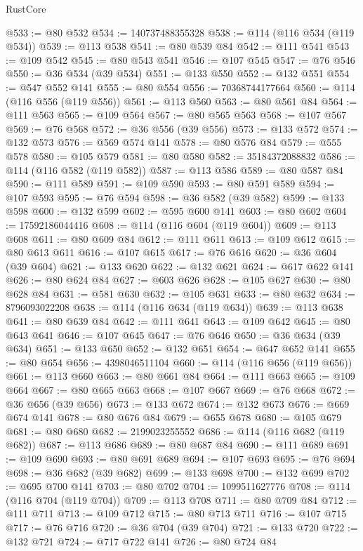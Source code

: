 \begin{lexlean}{RustCore}
\begin{coremodule}
@533 := @80 @532
@534 := 140737488355328
@538 := @114 (@116 @534 (@119 @534))
@539 := @113 @538
@541 := @80 @539 @84
@542 := @111 @541
@543 := @109 @542
@545 := @80 @543 @541
@546 := @107 @545
@547 := @76 @546
@550 := @36 @534 (@39 @534)
@551 := @133 @550
@552 := @132 @551
@554 := @547 @552 @141
@555 := @80 @554
@556 := 70368744177664
@560 := @114 (@116 @556 (@119 @556))
@561 := @113 @560
@563 := @80 @561 @84
@564 := @111 @563
@565 := @109 @564
@567 := @80 @565 @563
@568 := @107 @567
@569 := @76 @568
@572 := @36 @556 (@39 @556)
@573 := @133 @572
@574 := @132 @573
@576 := @569 @574 @141
@578 := @80 @576 @84
@579 := @555 @578
@580 := @105 @579
@581 := @80 @580
@582 := 35184372088832
@586 := @114 (@116 @582 (@119 @582))
@587 := @113 @586
@589 := @80 @587 @84
@590 := @111 @589
@591 := @109 @590
@593 := @80 @591 @589
@594 := @107 @593
@595 := @76 @594
@598 := @36 @582 (@39 @582)
@599 := @133 @598
@600 := @132 @599
@602 := @595 @600 @141
@603 := @80 @602
@604 := 17592186044416
@608 := @114 (@116 @604 (@119 @604))
@609 := @113 @608
@611 := @80 @609 @84
@612 := @111 @611
@613 := @109 @612
@615 := @80 @613 @611
@616 := @107 @615
@617 := @76 @616
@620 := @36 @604 (@39 @604)
@621 := @133 @620
@622 := @132 @621
@624 := @617 @622 @141
@626 := @80 @624 @84
@627 := @603 @626
@628 := @105 @627
@630 := @80 @628 @84
@631 := @581 @630
@632 := @105 @631
@633 := @80 @632
@634 := 8796093022208
@638 := @114 (@116 @634 (@119 @634))
@639 := @113 @638
@641 := @80 @639 @84
@642 := @111 @641
@643 := @109 @642
@645 := @80 @643 @641
@646 := @107 @645
@647 := @76 @646
@650 := @36 @634 (@39 @634)
@651 := @133 @650
@652 := @132 @651
@654 := @647 @652 @141
@655 := @80 @654
@656 := 4398046511104
@660 := @114 (@116 @656 (@119 @656))
@661 := @113 @660
@663 := @80 @661 @84
@664 := @111 @663
@665 := @109 @664
@667 := @80 @665 @663
@668 := @107 @667
@669 := @76 @668
@672 := @36 @656 (@39 @656)
@673 := @133 @672
@674 := @132 @673
@676 := @669 @674 @141
@678 := @80 @676 @84
@679 := @655 @678
@680 := @105 @679
@681 := @80 @680
@682 := 2199023255552
@686 := @114 (@116 @682 (@119 @682))
@687 := @113 @686
@689 := @80 @687 @84
@690 := @111 @689
@691 := @109 @690
@693 := @80 @691 @689
@694 := @107 @693
@695 := @76 @694
@698 := @36 @682 (@39 @682)
@699 := @133 @698
@700 := @132 @699
@702 := @695 @700 @141
@703 := @80 @702
@704 := 1099511627776
@708 := @114 (@116 @704 (@119 @704))
@709 := @113 @708
@711 := @80 @709 @84
@712 := @111 @711
@713 := @109 @712
@715 := @80 @713 @711
@716 := @107 @715
@717 := @76 @716
@720 := @36 @704 (@39 @704)
@721 := @133 @720
@722 := @132 @721
@724 := @717 @722 @141
@726 := @80 @724 @84

\end{coremodule}
\end{lexlean}
